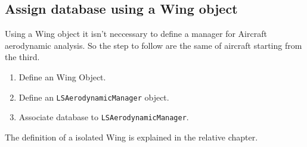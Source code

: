 \subsection {Assign database using a Wing object}
Using a Wing object it isn't neccessary to define a manager for Aircraft aerodynamic analysis. So the step to follow are the same of aircraft starting from the third.
\begin{enumerate}
\item Define an Wing Object.
\item Define an \texttt{LSAerodynamicManager} object.
\item Associate database to \texttt{LSAerodynamicManager}.
\end{enumerate}

The definition of a isolated Wing is explained in the relative chapter.

%
%		
%		
%		
%		
%		
%		
%		
%
%		

